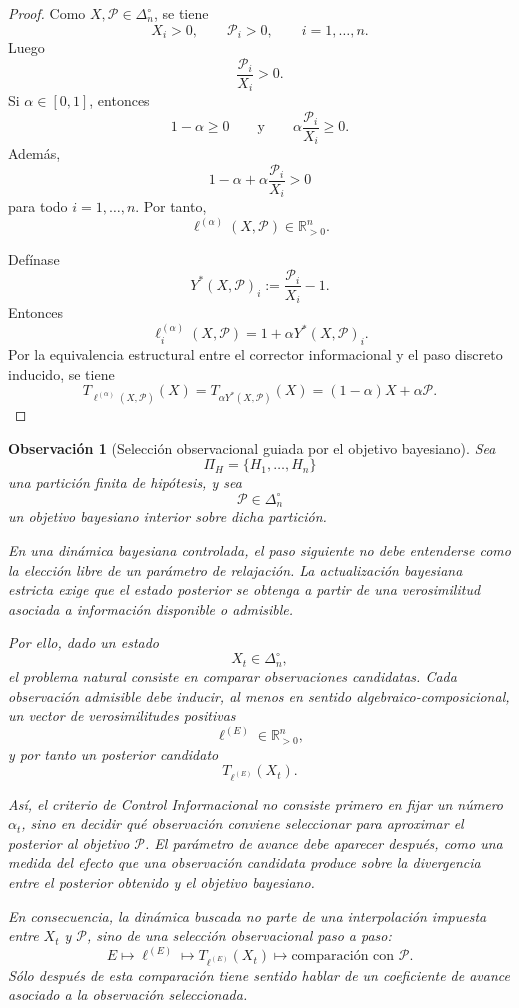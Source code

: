 ﻿\documentclass[12pt]{article}
\newtheorem{observacion}{Observación}[section]
\begin{document}
\begin{proof}
Como \(X,\mathcal P\in\Delta_n^\circ\), se tiene
\[
X_i>0,
\qquad
\mathcal P_i>0,
\qquad
i=1,\dots,n.
\]
Luego
\[
\frac{\mathcal P_i}{X_i}>0.
\]
Si \(\alpha\in[0,1]\), entonces
\[
1-\alpha\geq 0
\qquad
\text{y}
\qquad
\alpha\frac{\mathcal P_i}{X_i}\geq 0.
\]
Además,
\[
1-\alpha+\alpha\frac{\mathcal P_i}{X_i}>0
\]
para todo \(i=1,\dots,n\). Por tanto,
\[
\ell^{(\alpha)}(X,\mathcal P)\in\mathbb R_{>0}^n.
\]

Defínase
\[
Y^*(X,\mathcal P)_i
:=
\frac{\mathcal P_i}{X_i}-1.
\]
Entonces
\[
\ell^{(\alpha)}_i(X,\mathcal P)
=
1+\alpha Y^*(X,\mathcal P)_i.
\]
Por la equivalencia estructural entre el corrector informacional y el paso discreto inducido, se tiene
\[
T_{\ell^{(\alpha)}(X,\mathcal P)}(X)
=
T_{\alpha Y^*(X,\mathcal P)}(X)
=
(1-\alpha)X+\alpha \mathcal P.
\]
\end{proof}

\begin{observacion}[Selección observacional guiada por el objetivo bayesiano]
Sea
\[
\Pi_H=\{H_1,\dots,H_n\}
\]
una partición finita de hipótesis, y sea
\[
\mathcal P\in\Delta_n^\circ
\]
un objetivo bayesiano interior sobre dicha partición.

En una dinámica bayesiana controlada, el paso siguiente no debe entenderse como la elección libre de un parámetro de relajación. La actualización bayesiana estricta exige que el estado posterior se obtenga a partir de una verosimilitud asociada a información disponible o admisible.

Por ello, dado un estado
\[
X_t\in\Delta_n^\circ,
\]
el problema natural consiste en comparar observaciones candidatas. Cada observación admisible debe inducir, al menos en sentido algebraico-composicional, un vector de verosimilitudes positivas
\[
\ell^{(E)}\in\mathbb R_{>0}^n,
\]
y por tanto un posterior candidato
\[
T_{\ell^{(E)}}(X_t).
\]

Así, el criterio de Control Informacional no consiste primero en fijar un número \(\alpha_t\), sino en decidir qué observación conviene seleccionar para aproximar el posterior al objetivo \(\mathcal P\). El parámetro de avance debe aparecer después, como una medida del efecto que una observación candidata produce sobre la divergencia entre el posterior obtenido y el objetivo bayesiano.

En consecuencia, la dinámica buscada no parte de una interpolación impuesta entre \(X_t\) y \(\mathcal P\), sino de una selección observacional paso a paso:
\[
E
\longmapsto
\ell^{(E)}
\longmapsto
T_{\ell^{(E)}}(X_t)
\longmapsto
\text{comparación con }\mathcal P.
\]
Sólo después de esta comparación tiene sentido hablar de un coeficiente de avance asociado a la observación seleccionada.
\end{observacion}
\end{document}

